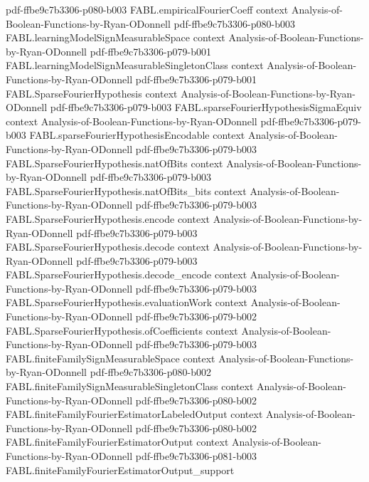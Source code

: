 \begin{theorem}
  {pdf-ffbe9c7b3306-p080-b003}
\proofstep
  {FABL.empiricalFourierCoeff}
  {context}
  {Analysis-of-Boolean-Functions-by-Ryan-ODonnell}
  {pdf-ffbe9c7b3306-p080-b003}
\proofstep
  {FABL.learningModelSignMeasurableSpace}
  {context}
  {Analysis-of-Boolean-Functions-by-Ryan-ODonnell}
  {pdf-ffbe9c7b3306-p079-b001}
\proofstep
  {FABL.learningModelSignMeasurableSingletonClass}
  {context}
  {Analysis-of-Boolean-Functions-by-Ryan-ODonnell}
  {pdf-ffbe9c7b3306-p079-b001}
\proofstep
  {FABL.SparseFourierHypothesis}
  {context}
  {Analysis-of-Boolean-Functions-by-Ryan-ODonnell}
  {pdf-ffbe9c7b3306-p079-b003}
\proofstep
  {FABL.sparseFourierHypothesisSigmaEquiv}
  {context}
  {Analysis-of-Boolean-Functions-by-Ryan-ODonnell}
  {pdf-ffbe9c7b3306-p079-b003}
\proofstep
  {FABL.sparseFourierHypothesisEncodable}
  {context}
  {Analysis-of-Boolean-Functions-by-Ryan-ODonnell}
  {pdf-ffbe9c7b3306-p079-b003}
\proofstep
  {FABL.SparseFourierHypothesis.natOfBits}
  {context}
  {Analysis-of-Boolean-Functions-by-Ryan-ODonnell}
  {pdf-ffbe9c7b3306-p079-b003}
\proofstep
  {FABL.SparseFourierHypothesis.natOfBits_bits}
  {context}
  {Analysis-of-Boolean-Functions-by-Ryan-ODonnell}
  {pdf-ffbe9c7b3306-p079-b003}
\proofstep
  {FABL.SparseFourierHypothesis.encode}
  {context}
  {Analysis-of-Boolean-Functions-by-Ryan-ODonnell}
  {pdf-ffbe9c7b3306-p079-b003}
\proofstep
  {FABL.SparseFourierHypothesis.decode}
  {context}
  {Analysis-of-Boolean-Functions-by-Ryan-ODonnell}
  {pdf-ffbe9c7b3306-p079-b003}
\proofstep
  {FABL.SparseFourierHypothesis.decode_encode}
  {context}
  {Analysis-of-Boolean-Functions-by-Ryan-ODonnell}
  {pdf-ffbe9c7b3306-p079-b003}
\proofstep
  {FABL.SparseFourierHypothesis.evaluationWork}
  {context}
  {Analysis-of-Boolean-Functions-by-Ryan-ODonnell}
  {pdf-ffbe9c7b3306-p079-b002}
\proofstep
  {FABL.SparseFourierHypothesis.ofCoefficients}
  {context}
  {Analysis-of-Boolean-Functions-by-Ryan-ODonnell}
  {pdf-ffbe9c7b3306-p079-b003}
\proofstep
  {FABL.finiteFamilySignMeasurableSpace}
  {context}
  {Analysis-of-Boolean-Functions-by-Ryan-ODonnell}
  {pdf-ffbe9c7b3306-p080-b002}
\proofstep
  {FABL.finiteFamilySignMeasurableSingletonClass}
  {context}
  {Analysis-of-Boolean-Functions-by-Ryan-ODonnell}
  {pdf-ffbe9c7b3306-p080-b002}
\proofstep
  {FABL.finiteFamilyFourierEstimatorLabeledOutput}
  {context}
  {Analysis-of-Boolean-Functions-by-Ryan-ODonnell}
  {pdf-ffbe9c7b3306-p080-b002}
\proofstep
  {FABL.finiteFamilyFourierEstimatorOutput}
  {context}
  {Analysis-of-Boolean-Functions-by-Ryan-ODonnell}
  {pdf-ffbe9c7b3306-p081-b003}
\proofstep
  {FABL.finiteFamilyFourierEstimatorOutput_support}

\end{theorem}
